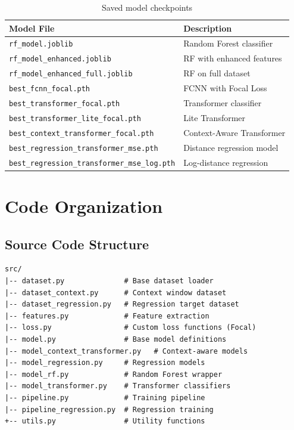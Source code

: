 \documentclass[11pt,a4paper]{article}
\begin{document}
\begin{table}[h]
\centering
\begin{tabular}{@{}ll@{}}
\toprule
\textbf{Model File} & \textbf{Description} \\ \midrule
\texttt{rf\_model.joblib} & Random Forest classifier \\
\texttt{rf\_model\_enhanced.joblib} & RF with enhanced features \\
\texttt{rf\_model\_enhanced\_full.joblib} & RF on full dataset \\
\texttt{best\_fcnn\_focal.pth} & FCNN with Focal Loss \\
\texttt{best\_transformer\_focal.pth} & Transformer classifier \\
\texttt{best\_transformer\_lite\_focal.pth} & Lite Transformer \\
\texttt{best\_context\_transformer\_focal.pth} & Context-Aware Transformer \\
\texttt{best\_regression\_transformer\_mse.pth} & Distance regression model \\
\texttt{best\_regression\_transformer\_mse\_log.pth} & Log-distance regression \\ \bottomrule
\end{tabular}
\caption{Saved model checkpoints}
\end{table}

\section{Code Organization}

\subsection{Source Code Structure}
\begin{verbatim}
src/
|-- dataset.py              # Base dataset loader
|-- dataset_context.py      # Context window dataset
|-- dataset_regression.py   # Regression target dataset
|-- features.py             # Feature extraction
|-- loss.py                 # Custom loss functions (Focal)
|-- model.py                # Base model definitions
|-- model_context_transformer.py   # Context-aware models
|-- model_regression.py     # Regression models
|-- model_rf.py             # Random Forest wrapper
|-- model_transformer.py    # Transformer classifiers
|-- pipeline.py             # Training pipeline
|-- pipeline_regression.py  # Regression training
+-- utils.py                # Utility functions
\end{verbatim}
\end{document}
